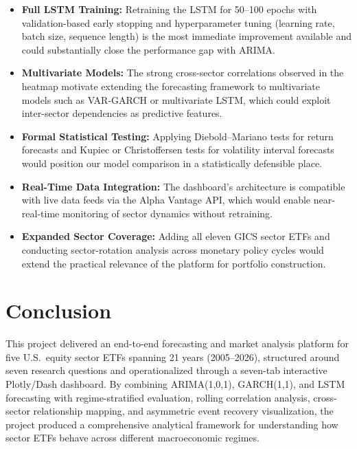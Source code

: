 \documentclass[12pt]{article}
\begin{document}
\begin{itemize} %
    \item \textbf{Full LSTM Training:} Retraining the LSTM for 50--100 epochs with validation-based early stopping and hyperparameter tuning (learning rate, batch size, sequence length) is the most immediate improvement available and could substantially close the performance gap with ARIMA.

    \item \textbf{Multivariate Models:} The strong cross-sector correlations observed in the heatmap motivate extending the forecasting framework to multivariate models such as VAR-GARCH or multivariate LSTM, which could exploit inter-sector dependencies as predictive features.

    \item \textbf{Formal Statistical Testing:} Applying Diebold--Mariano tests for return forecasts and Kupiec or Christoffersen tests for volatility interval forecasts would position our model comparison in a statistically defensible place.
    
    \item \textbf{Real-Time Data Integration:} The dashboard's architecture is compatible with live data feeds via the Alpha Vantage API, which would enable near-real-time monitoring of sector dynamics without retraining.

    \item \textbf{Expanded Sector Coverage:} Adding all eleven GICS sector ETFs and conducting sector-rotation analysis across monetary policy cycles would extend the practical relevance of the platform for portfolio construction.
\end{itemize}

\section{Conclusion}

\noindent This project delivered an end-to-end forecasting and market analysis platform for five U.S.\ equity sector ETFs spanning 21 years (2005--2026), structured around seven research questions and operationalized through a seven-tab interactive Plotly/Dash dashboard. By combining ARIMA(1,0,1), GARCH(1,1), and LSTM forecasting with regime-stratified evaluation, rolling correlation analysis, cross-sector relationship mapping, and asymmetric event recovery visualization, the project produced a comprehensive analytical framework for understanding how sector ETFs behave across different macroeconomic regimes.
\end{document}
